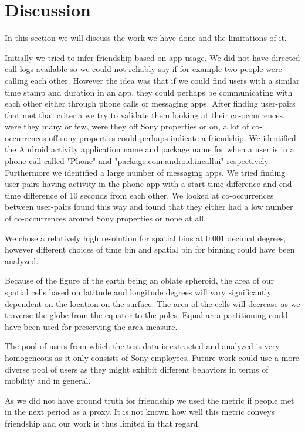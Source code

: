 \chapter{Discussion}
\label{chap:discussion}
In this section we will discuss the work we have done and the limitations of it.

Initially we tried to infer friendship based on app usage. We did not have directed call-logs available so we could not reliably say if for example two people were calling each other. However the idea was that if we could find users with a similar time stamp and duration in an app, they could perhaps be communicating with each other either through phone calls or messaging apps. After finding user-pairs that met that criteria we try to validate them looking at their co-occurrences, were they many or few, were they off Sony properties or on, a lot of co-occurrences off sony properties could perhaps indicate a friendship. We identified the Android activity application name and package name for when a user is in a phone call called "Phone" and "package.com.android.incallui" respectively. Furthermore we identified a large number of messaging apps. We tried finding user pairs having activity in the phone app with a start time difference and end time difference of 10 seconds from each other. We looked at co-occurrences between user-pairs found this way and found that they either had a low number of co-occurrences around Sony properties or none at all.

We chose a relatively high resolution for spatial bins at 0.001 decimal degrees, however different choices of time bin and spatial bin for binning could have been analyzed.

Because of the figure of the earth being an oblate spheroid, the area of our spatial cells based on latitude and longitude degrees will vary significantly dependent on the location on the surface. The area of the cells will decrease as we traverse the globe from the equator to the poles. Equal-area partitioning could have been used for preserving the area measure.

The pool of users from which the test data is extracted and analyzed is very homogeneous as it only consists of Sony employees. Future work could use a more diverse pool of users as they might exhibit different behaviors in terms of mobility and in general.

As we did not have ground truth for friendship we used the metric if people met in the next period as a proxy. It is not known how well this metric conveys friendship and our work is thus limited in that regard.

